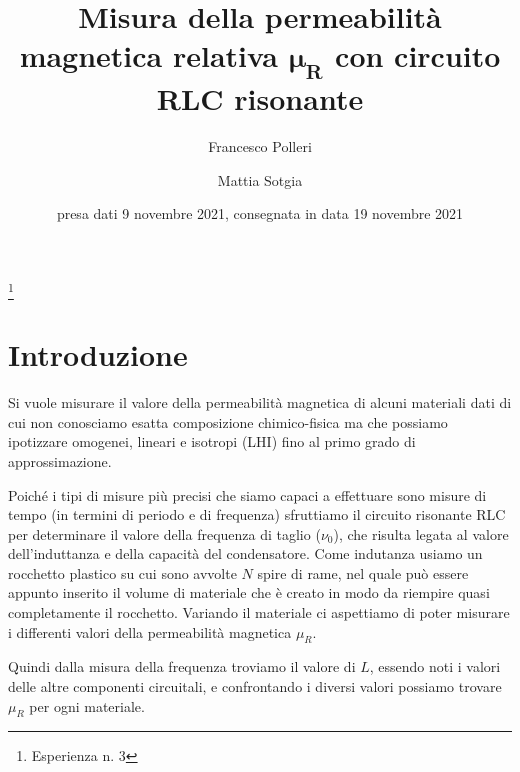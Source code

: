 \documentclass[
    rmp,
    floatfix,
    reprint, 
    superscriptaddress, 
    altaffilletter, 
    amsmath, 
    amssymb, 
    a4paper]{revtex4-2}
\begin{document}
\title{Misura della permeabilità magnetica relativa $\mathbf{\mu_R}$ con circuito RLC risonante
}
\thanks{Esperienza n. 3
}

\author{Francesco Polleri}
\author{Mattia Sotgia}


\date{presa dati
    9 novembre 2021, consegnata in data
    19 novembre 2021
}

\begin{abstract}
    
\end{abstract}
\maketitle
\thispagestyle{fancy}


\section*{Introduzione}\label{sec:introduction}
Si vuole misurare il valore della permeabilità magnetica di alcuni materiali dati di cui non conosciamo esatta composizione chimico-fisica ma che possiamo ipotizzare omogenei, lineari e isotropi (LHI) fino al primo grado di approssimazione. 

Poiché i tipi di misure più precisi che siamo capaci a effettuare sono misure di tempo (in termini di periodo e di frequenza) sfruttiamo il circuito risonante RLC per determinare il valore della frequenza di taglio ($\nu_0$), che risulta legata al valore dell'induttanza e della capacità del condensatore. Come indutanza usiamo un rocchetto plastico su cui sono avvolte $N$ spire di rame, nel quale può essere appunto inserito il volume di materiale che è creato in modo da riempire quasi completamente il rocchetto. Variando il materiale ci aspettiamo di poter misurare i differenti valori della permeabilità magnetica $\mu_R$.

Quindi dalla misura della frequenza troviamo il valore di $L$, essendo noti i valori delle altre componenti circuitali, e confrontando i diversi valori possiamo trovare $\mu_R$ per ogni materiale.
\end{document}
